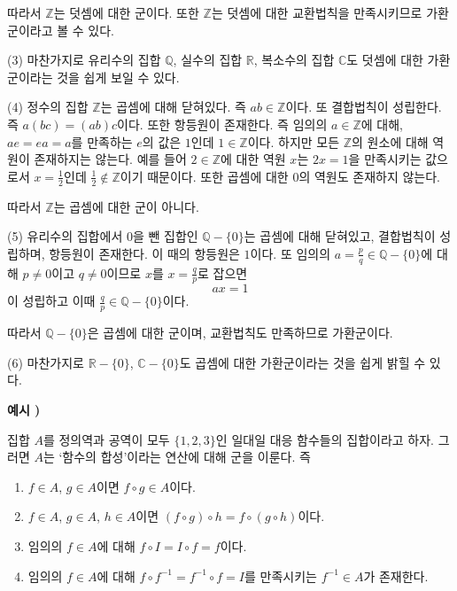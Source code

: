 \documentclass{article}
\newcounter{num}
\newcommand{\exam}[1]
{\bigskip\noindent\refstepcounter{num}\textbf{예시 \arabic{num}) #1}\par}
\begin{document}
따라서 \(\mathbb Z\)는 덧셈에 대한 군이다.
또한 \(\mathbb Z\)는 덧셈에 대한 교환법칙을 만족시키므로 가환군이라고 볼 수 있다.
\medskip

(3)
마찬가지로 유리수의 집합 \(\mathbb Q\), 실수의 집합 \(\mathbb R\), 복소수의 집합 \(\mathbb C\)도 덧셈에 대한 가환군이라는 것을 쉽게 보일 수 있다.
\medskip

(4)
정수의 집합 \(\mathbb Z\)는 곱셈에 대해 닫혀있다.
즉 \(ab\in\mathbb Z\)이다.
또 결합법칙이 성립한다.
즉 \(a(bc)=(ab)c\)이다.
또한 항등원이 존재한다.
즉 임의의 \(a\in\mathbb Z\)에 대해, \(ae=ea=a\)를 만족하는 \(e\)의 값은 \(1\)인데 \(1\in\mathbb Z\)이다.
하지만 모든 \(\mathbb Z\)의 원소에 대해 역원이 존재하지는 않는다.
예를 들어 \(2\in\mathbb Z\)에 대한 역원 \(x\)는 \(2x=1\)을 만족시키는 값으로서 \(x=\frac12\)인데 \(\frac12\not\in\mathbb Z\)이기 때문이다.
또한  곱셈에 대한 \(0\)의 역원도 존재하지 않는다.

따라서 \(\mathbb Z\)는 곱셈에 대한 군이 아니다.
\medskip

(5)
유리수의 집합에서 0을 뺀 집합인 \(\mathbb Q-\{0\}\)는 곱셈에 대해 닫혀있고, 결합법칙이 성립하며, 항등원이 존재한다.
이 때의 항등원은 \(1\)이다.
또 임의의 \(a=\frac pq\in\mathbb Q-\{0\}\)에 대해 \(p\neq0\)이고 \(q\neq0\)이므로 \(x\)를 \(x=\frac qp\)로 잡으면
\[ax=1\]
이 성립하고 이때 \(\frac qp\in\mathbb Q-\{0\}\)이다.

따라서 \(\mathbb Q-\{0\}\)은 곱셈에 대한 군이며, 교환법칙도 만족하므로 가환군이다.
\medskip


(6)
마찬가지로 \(\mathbb R-\{0\}\), \(\mathbb C-\{0\}\)도 곱셈에 대한 가환군이라는 것을 쉽게 밝힐 수 있다.

%
%

%
\exam{}
집합 \(A\)를 정의역과 공역이 모두 \(\{1,2,3\}\)인 일대일 대응 함수들의 집합이라고 하자.
그러면 \(A\)는 `함수의 합성'이라는 연산에 대해 군을 이룬다.
즉
\begin{enumerate}
\item
\(f\in A\), \(g\in A\)이면 \(f\circ g\in A\)이다.
\item
\(f\in A\), \(g\in A\), \(h\in A\)이면 \((f\circ g)\circ h=f\circ(g\circ h)\)이다.
\item
임의의 \(f\in A\)에 대해 \(f\circ I=I\circ f=f\)이다.
\item
임의의 \(f\in A\)에 대해 \(f\circ f^{-1}=f^{-1}\circ f=I\)를 만족시키는 \(f^{-1}\in A\)가 존재한다.
\end{enumerate}
\end{document}
